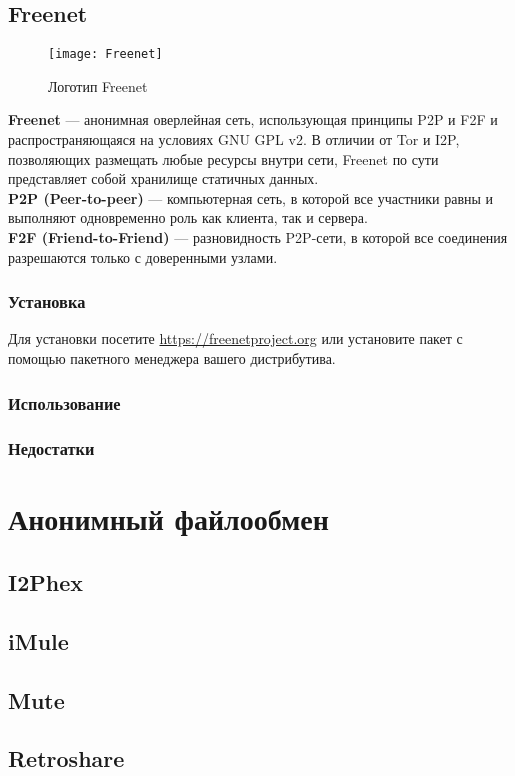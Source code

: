 \subsection{Freenet}
\begin{wrapfigure}[9]{r}{0.25\linewidth}
\texttt{[image: Freenet]}
\caption{Логотип Freenet}
\end{wrapfigure}
\textbf{Freenet} --- анонимная оверлейная сеть, использующая принципы P2P и F2F и распространяющаяся на условиях GNU GPL v2\cite{freenet_license}. В отличии от Tor и I2P, позволяющих размещать любые ресурсы внутри сети, Freenet по сути представляет собой хранилище статичных данных.\\
\textbf{P2P (Peer-to-peer)} --- компьютерная сеть, в которой все участники равны и выполняют одновременно роль как клиента, так и сервера.\\
\textbf{F2F (Friend-to-Friend)} --- разновидность P2P-сети, в которой все соединения разрешаются только с доверенными узлами.
\subsubsection{Установка}
Для установки посетите \url{https://freenetproject.org} или установите пакет с помощью пакетного менеджера вашего дистрибутива.
\subsubsection{Использование}
\subsubsection{Недостатки}

\section{Анонимный файлообмен}
\subsection{I2Phex}
\subsection{iMule}
\subsection{Mute}
\subsection{Retroshare}
